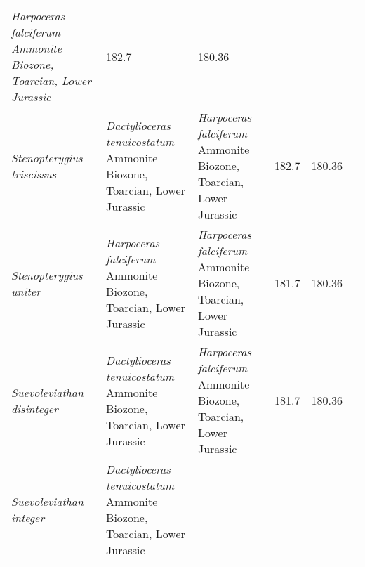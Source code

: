\begin{longtabu}{>{\itshape}lXXSSl}
        \emph{Harpoceras falciferum} Ammonite Biozone, Toarcian, Lower Jurassic
                                                                      & 182.7
                                                                      & 180.36
                                                                      &
                                                                      \cite{Maisch2008P,Maxwell2012JP} \\        
	Stenopterygius triscissus                            &
        \emph{Dactylioceras tenuicostatum} Ammonite Biozone, Toarcian, Lower
        Jurassic                                                      &
        \emph{Harpoceras falciferum} Ammonite Biozone, Toarcian, Lower Jurassic
                                                                      & 182.7
                                                                      & 180.36
                                                                      &
                                                                      \cite{Maisch2008P,Maxwell2012JP} \\        
	Stenopterygius uniter                                & \emph{Harpoceras
        falciferum} Ammonite Biozone, Toarcian, Lower Jurassic
                                                             & \emph{Harpoceras
        falciferum} Ammonite Biozone, Toarcian, Lower Jurassic
                                                             & 181.7
                                                             & 180.36
                                                             &
                                                             \cite{Maisch2008P,Maxwell2012JP} \\        
	Suevoleviathan disinteger                            &
        \emph{Dactylioceras tenuicostatum} Ammonite Biozone, Toarcian, Lower
        Jurassic                                                      &
        \emph{Harpoceras falciferum} Ammonite Biozone, Toarcian, Lower Jurassic
                                                                      & 181.7
                                                                      & 180.36
                                                                      &
                                                                      \cite{vonHuene1922,Maisch1998NJGPAd} \\          
	Suevoleviathan integer                               &
        \emph{Dactylioceras tenuicostatum} Ammonite Biozone, Toarcian, Lower
        Jurassic                                                      &

\end{longtabu}
